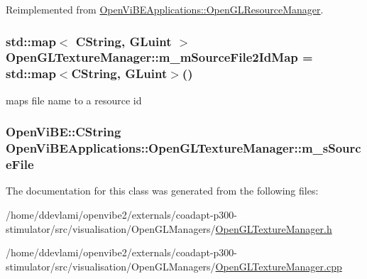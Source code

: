 Reimplemented from \hyperlink{classOpenViBEApplications_1_1OpenGLResourceManager_a5dfc8286721f8ec13adc4a0f7209e3e4}{OpenViBEApplications::OpenGLResourceManager}.

\hypertarget{classOpenViBEApplications_1_1OpenGLTextureManager_a0e7b52d70304021a44d2f2a5cd9c502c}{
\subsubsection[{m\_\-mSourceFile2IdMap}]{\setlength{\rightskip}{0pt plus 5cm}std::map$<$ CString, GLuint $>$ {\bf OpenGLTextureManager::m\_\-mSourceFile2IdMap} = std::map$<$CString, GLuint$>$()}}
\label{classOpenViBEApplications_1_1OpenGLTextureManager_a0e7b52d70304021a44d2f2a5cd9c502c}
maps file name to a resource id \hypertarget{classOpenViBEApplications_1_1OpenGLTextureManager_a461423473ce47d21df7dea4765b3f51b}{
\subsubsection[{m\_\-sSourceFile}]{\setlength{\rightskip}{0pt plus 5cm}OpenViBE::CString {\bf OpenViBEApplications::OpenGLTextureManager::m\_\-sSourceFile}}}
\label{classOpenViBEApplications_1_1OpenGLTextureManager_a461423473ce47d21df7dea4765b3f51b}


The documentation for this class was generated from the following files:\begin{DoxyCompactItemize}
\item 
/home/ddevlami/openvibe2/externals/coadapt-\/p300-\/stimulator/src/visualisation/OpenGLManagers/\hyperlink{OpenGLTextureManager_8h}{OpenGLTextureManager.h}\item 
/home/ddevlami/openvibe2/externals/coadapt-\/p300-\/stimulator/src/visualisation/OpenGLManagers/\hyperlink{OpenGLTextureManager_8cpp}{OpenGLTextureManager.cpp}\end{DoxyCompactItemize}
